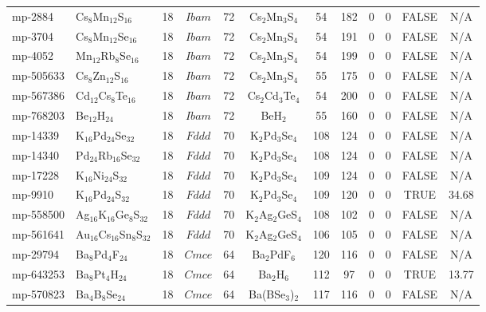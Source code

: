 {\begin{longtable}{llcccccccccc}
    mp-2884 & Cs$_{8}$Mn$_{12}$S$_{16}$ & 18    & $Ibam$ & 72    & Cs$_{2}$Mn$_{3}$S$_{4}$ & 54    & 182   & 0     & 0     & FALSE & N/A \\
    mp-3704 & Cs$_{8}$Mn$_{12}$Se$_{16}$ & 18    & $Ibam$ & 72    & Cs$_{2}$Mn$_{3}$S$_{4}$ & 54    & 191   & 0     & 0     & FALSE & N/A \\
    mp-4052 & Mn$_{12}$Rb$_{8}$Se$_{16}$ & 18    & $Ibam$ & 72    & Cs$_{2}$Mn$_{3}$S$_{4}$ & 54    & 199   & 0     & 0     & FALSE & N/A \\
    mp-505633 & Cs$_{8}$Zn$_{12}$S$_{16}$ & 18    & $Ibam$ & 72    & Cs$_{2}$Mn$_{3}$S$_{4}$ & 55    & 175   & 0     & 0     & FALSE & N/A \\
    mp-567386 & Cd$_{12}$Cs$_{8}$Te$_{16}$ & 18    & $Ibam$ & 72    & Cs$_{2}$Cd$_{3}$Te$_{4}$ & 54    & 200   & 0     & 0     & FALSE & N/A \\
    mp-768203 & Be$_{12}$H$_{24}$ & 18    & $Ibam$ & 72    & BeH$_{2}$ & 55    & 160   & 0     & 0     & FALSE & N/A \\
    mp-14339 & K$_{16}$Pd$_{24}$Se$_{32}$ & 18    & $Fddd$ & 70    & K$_{2}$Pd$_{3}$Se$_{4}$ & 108   & 124   & 0     & 0     & FALSE & N/A \\
    mp-14340 & Pd$_{24}$Rb$_{16}$Se$_{32}$ & 18    & $Fddd$ & 70    & K$_{2}$Pd$_{3}$Se$_{4}$ & 108   & 124   & 0     & 0     & FALSE & N/A \\
    mp-17228 & K$_{16}$Ni$_{24}$S$_{32}$ & 18    & $Fddd$ & 70    & K$_{2}$Pd$_{3}$Se$_{4}$ & 109   & 124   & 0     & 0     & FALSE & N/A \\
    mp-9910 & K$_{16}$Pd$_{24}$S$_{32}$ & 18    & $Fddd$ & 70    & K$_{2}$Pd$_{3}$Se$_{4}$ & 109   & 120   & 0     & 0     & TRUE  & 34.68  \\
    mp-558500 & Ag$_{16}$K$_{16}$Ge$_{8}$S$_{32}$ & 18    & $Fddd$ & 70    & K$_{2}$Ag$_{2}$GeS$_{4}$ & 108   & 102   & 0     & 0     & FALSE & N/A \\
    mp-561641 & Au$_{16}$Cs$_{16}$Sn$_{8}$S$_{32}$ & 18    & $Fddd$ & 70    & K$_{2}$Ag$_{2}$GeS$_{4}$ & 106   & 105   & 0     & 0     & FALSE & N/A \\
    mp-29794 & Ba$_{8}$Pd$_{4}$F$_{24}$ & 18    & $Cmce$ & 64    & Ba$_{2}$PdF$_{6}$ & 120   & 116   & 0     & 0     & FALSE & N/A \\
    mp-643253 & Ba$_{8}$Pt$_{4}$H$_{24}$ & 18    & $Cmce$ & 64    & Ba$_{2}$H$_{6}$ & 112   & 97    & 0     & 0     & TRUE  & 13.77  \\
    mp-570823 & Ba$_{4}$B$_{8}$Se$_{24}$ & 18    & $Cmce$ & 64    & Ba(BSe$_{3}$)$_{2}$ & 117   & 116   & 0     & 0     & FALSE & N/A \\

\end{longtable}}
